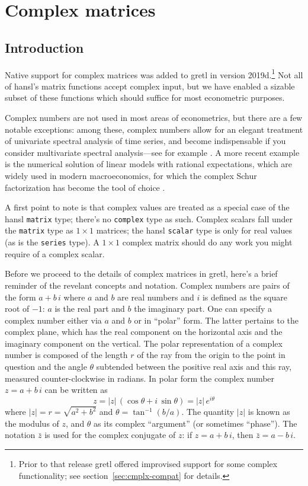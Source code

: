 \chapter{Complex matrices}
\label{chap:complex}

\section{Introduction}
\label{sec:cmplx-intro}

Native support for complex matrices was added to gretl in version
2019d.\footnote{Prior to that release gretl offered improvised support
  for some complex functionality; see section~\ref{sec:cmplx-compat}
  for details.} Not all of hansl's matrix functions accept complex
input, but we have enabled a sizable subset of these functions which
should suffice for most econometric purposes.

Complex numbers are not used in most areas of econometrics, but there
are a few notable exceptions: among these, complex numbers allow for
an elegant treatment of univariate spectral analysis of time series,
and become indispensable if you consider multivariate spectral
analysis---see for example \cite{shumwaystoffer2017}. A more recent
example is the numerical solution of linear models with rational
expectations, which are widely used in modern macroeconomics, for
which the complex Schur factorization has become the tool of choice
\citep{klein2000}.

A first point to note is that complex values are treated as a special
case of the hansl \texttt{matrix} type; there's no \texttt{complex}
type as such. Complex scalars fall under the \texttt{matrix} type as
$1 \times 1$ matrices; the hansl \texttt{scalar} type is only for real
values (as is the \texttt{series} type). A $1 \times 1$ complex matrix
should do any work you might require of a complex scalar.

Before we proceed to the details of complex matrices in gretl, here's
a brief reminder of the revelant concepts and notation. Complex
numbers are pairs of the form $a + b\,i$ where $a$ and $b$ are real
numbers and $i$ is defined as the square root of $-1$: $a$ is the real
part and $b$ the imaginary part. One can specify a complex number
either via $a$ and $b$ or in ``polar'' form. The latter pertains to
the complex plane, which has the real component on the horizontal axis
and the imaginary component on the vertical. The polar representation
of a complex number is composed of the length $r$ of the ray from the
origin to the point in question and the angle $\theta$ subtended
between the positive real axis and this ray, measured
counter-clockwise in radians. In polar form the complex number
$z = a + b\,i$ can be written as
\[
  z = |z|\,(\cos \theta + i\,\sin \theta) = |z|\,e^{i\theta}
\]
where $|z| = r = \sqrt{a^2 + b^2}$ and $\theta = \tan^{-1}(b/a)$. The
quantity $|z|$ is known as the modulus of $z$, and $\theta$ as its
complex ``argument'' (or sometimes ``phase''). The notation $\bar{z}$
is used for the complex conjugate of $z$: if $z = a + b\,i$, then
$\bar{z} = a - b\,i$.

